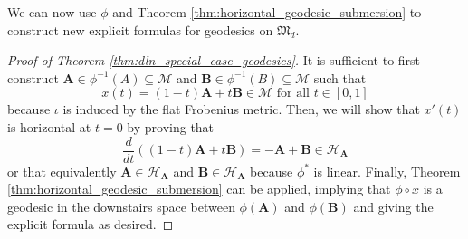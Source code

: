 \documentclass{amsart}
\theoremstyle{definition}
\theoremstyle{remark}
\numberwithin{equation}{section}
\begin{document}
We can now use $\phi$ and Theorem \ref{thm:horizontal_geodesic_submersion} to construct new explicit formulas for geodesics on $\mathfrak{M}_d$.
\begin{proof}[Proof of Theorem \ref{thm:dln_special_case_geodesics}]
    It is sufficient to first construct $\mathbf{A} \in \phi^{-1}(A) \subseteq \mathcal{M}$ and $\mathbf{B} \in \phi^{-1}(B) \subseteq \mathcal{M}$ such that \begin{equation}
    x(t) = (1-t)\mathbf{A}+ t\mathbf{B} \in \mathcal{M} \text{ for all } t \in [0,1]
    \end{equation}
    because $\iota$ is induced by the flat Frobenius metric. Then, we will show that $x'(t)$ is horizontal at $t=0$ by proving that
    \begin{equation}\label{eq:horizontal_derivative_condition}
        \frac{d}{dt} \left((1-t) \mathbf{A} + t\mathbf{B}\right) = -\mathbf{A} + \mathbf{B} \in \mathcal{H}_{\mathbf{A}}
    \end{equation}
    or that equivalently $\mathbf{A} \in \mathcal{H}_{\mathbf{A}}$ and $\mathbf{B} \in \mathcal{H}_{\mathbf{A}}$ because $\phi^*$ is linear. Finally, Theorem \ref{thm:horizontal_geodesic_submersion} can be applied, implying that $\phi \circ x$ is a geodesic in the downstairs space between $\phi(\mathbf{A})$ and $\phi(\mathbf{B})$ and giving the explicit formula as desired.
    

\end{proof}
\end{document}
